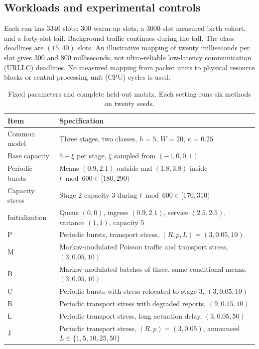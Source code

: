 \documentclass{IEEEoj}
\begin{document}
\subsection{Workloads and experimental controls}
Each run has 3340 slots: 300 warm-up slots, a 3000-slot measured birth cohort,
and a forty-slot tail. Background traffic continues during the tail. The class
deadlines are $(15,40)$ slots. An illustrative mapping of twenty milliseconds
per slot gives 300 and 800 milliseconds, not ultra-reliable low-latency communication (URLLC) deadlines. No measured
mapping from packet units to physical resource blocks or central processing unit (CPU) cycles is used.

\begin{table}[htbp]\centering\small
\caption{Fixed parameters and complete held-out matrix. Each setting runs six methods on twenty seeds.}
\begin{tabular}{p{31mm}p{116mm}}\toprule
Item & Specification\\\midrule
Common model & Three stages, two classes, $h=5$, $W=20$, $\kappa=0.25$\\
Base capacity & $5+\xi$ per stage, $\xi$ sampled from $(-1,0,0,1)$\\
Periodic bursts & Means $(0.9,2.1)$ outside and $(1.8,3.8)$ inside $t\bmod600\in[180,290)$\\
Capacity stress & Stage 2 capacity $3$ during $t\bmod600\in[170,310)$\\
Initialization & Queue $(0,0)$, ingress $(0.9,2.1)$, service $(2.5,2.5)$, variance $(1,1)$, capacity $5$\\
P & Periodic bursts, transport stress, $(R,p,L)=(3,0.05,10)$\\
M & Markov-modulated Poisson traffic and transport stress, $(3,0.05,10)$\\
B & Markov-modulated batches of three, same conditional means, $(3,0.05,10)$\\
C & Periodic bursts with stress relocated to stage 3, $(3,0.05,10)$\\
R & Periodic transport stress with degraded reports, $(9,0.15,10)$\\
L & Periodic transport stress, long actuation delay, $(3,0.05,50)$\\
J & Periodic transport stress, $(R,p)=(3,0.05)$, announced $L\in\{1,5,10,25,50\}$\\\bottomrule
\end{tabular}\label{tab:settings}
\end{table}
\end{document}
